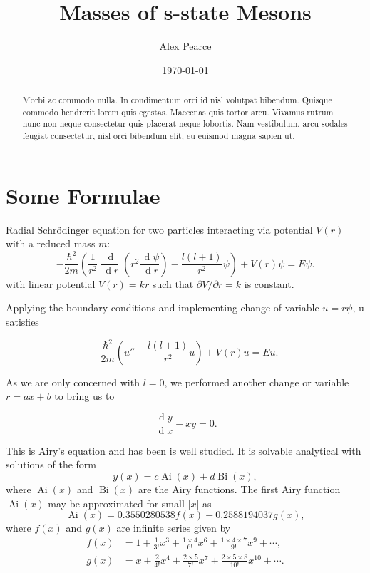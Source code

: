 \documentclass[]{article}
\renewcommand{\d}[1]{\ensuremath{\,\operatorname{d}\!{#1}}}
\renewcommand{\mod}[1]{\ensuremath{\lvert {#1} \rvert}}
\newcommand{\Ai}[1]{\ensuremath{\operatorname{Ai}({#1})}}
\newcommand{\Bi}[1]{\ensuremath{\operatorname{Bi}({#1})}}
\begin{document}
\title{Masses of s-state Mesons}
\author{Alex Pearce}
\date{\today}
\maketitle


\begin{abstract}
Morbi ac commodo nulla. In condimentum orci id nisl volutpat bibendum. Quisque commodo hendrerit lorem quis egestas. Maecenas quis tortor arcu. Vivamus rutrum nunc non neque consectetur quis placerat neque lobortis. Nam vestibulum, arcu sodales feugiat consectetur, nisl orci bibendum elit, eu euismod magna sapien ut.
\end{abstract}

\section{Some Formulae}

Radial Schr\"{o}dinger equation for two particles interacting via potential $V(r)$ with a reduced mass $m$:
\[
-\frac{\hbar^{2}}{2m}\left (
	\frac{1}{r^{2}} \frac{\d{}}{\d{r}} \left (
		r^{2} \frac{\d{\psi}}{\d{r}}
	\right )
	- \frac{l(l+1)}{r^{2}}\psi
\right )
+ V(r)\psi = E\psi.
\]
with linear potential $V(r) = kr$ such that $\partial V / \partial r = k$ is constant.

Applying the boundary conditions and implementing change of variable $u = r\psi$, u satisfies

\[
-\frac{\hbar^{2}}{2m}\left (
	u''
	- \frac{l(l+1)}{r^{2}}u
\right )
+ V(r)u = Eu.
\]

As we are only concerned with $l = 0$, we performed another change or variable $r = ax + b$ to bring us to

\[
\frac{\d{y}}{\d{x}} - xy = 0.
\]

This is Airy's equation and has been is well studied. It is solvable analytical with solutions of the form
\[
y(x) = c\Ai{x} + d\Bi{x},
\]
where $\Ai{x}$ and $\Bi{x}$ are the Airy functions. The first Airy function $\Ai{x}$ may be approximated for small $\mod{x}$ as
\[
\Ai{x} = 0.3550280538f(x) - 0.2588194037g(x),
\]
where $f(x)$ and $g(x)$ are infinite series given by
\begin{align*}
f(x) &= 1 + \frac{1}{3!}x^{3} + \frac{1\times4}{6!}x^{6} + \frac{1\times4\times{7}}{9!}x^{9} + \dotsb,\\
g(x) &= x + \frac{2}{4!}x^{4} + \frac{2\times5}{7!}x^{7} + \frac{2\times5\times{8}}{10!}x^{10} + \dotsb.
\end{align*}
\end{document}
